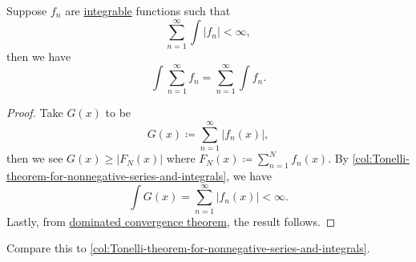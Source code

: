 \begin{corollary}\label{col:Tonelli-theorem-for-series-and-integrals}
	Suppose \(f_{n}\) are \hyperref[def:integrable]{integrable} functions such that
	\[
		\sum_{n=1}^{\infty} \int \left\vert f_{n} \right\vert < \infty,
	\]
	then we have
	\[
		\int \sum_{n=1}^{\infty} f_{n} = \sum_{n=1}^{\infty} \int f_{n}.
	\]
\end{corollary}
\begin{proof}
	Take \(G(x)\) to be
	\[
		G(x) \coloneqq \sum_{n=1}^{\infty} \left\vert f_{n}(x) \right\vert,
	\]
	then we see \(G(x) \geq \left\vert F_{N}(x) \right\vert\) where \(F_{N}(x) \coloneqq \sum_{n=1}^{N} f_{n}(x)\).
	By \autoref{col:Tonelli-theorem-for-nonnegative-series-and-integrals}, we have
	\[
		\int G(x) = \sum_{n=1}^{\infty} \left\vert f_{n}(x) \right\vert < \infty .
	\]
	Lastly, from \hyperref[thm:DCT]{dominated convergence theorem}, the result follows.
\end{proof}

\begin{note}
	Compare this to \autoref{col:Tonelli-theorem-for-nonnegative-series-and-integrals}.
\end{note}